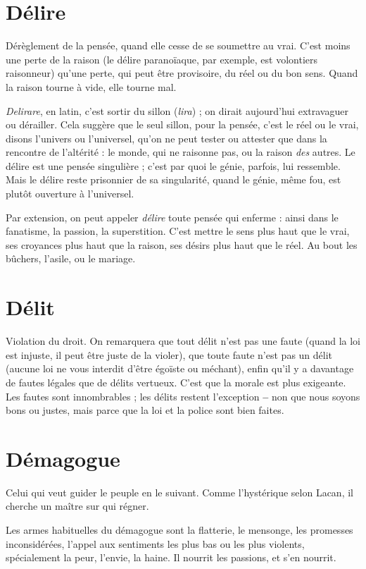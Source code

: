 \section{Délire}
Dérèglement de la pensée, quand elle cesse de se soumettre au vrai.
C’est moins une perte de la raison (le délire paranoïaque, par
exemple, est volontiers raisonneur) qu’une perte, qui peut être provisoire, du
réel ou du bon sens. Quand la raison tourne à vide, elle tourne mal.

{\it Delirare}, en latin, c’est sortir du sillon ({\it lira}) ; on dirait aujourd’hui extravaguer
ou dérailler. Cela suggère que le seul sillon, pour la pensée, c’est le réel ou
le vrai, disons l’univers ou l’universel, qu’on ne peut tester ou attester que dans
la rencontre de l’altérité : le monde, qui ne raisonne pas, ou la raison {\it des} autres.
Le délire est une pensée singulière ; c’est par quoi le génie, parfois, lui ressemble.
Mais le délire reste prisonnier de sa singularité, quand le génie, même
fou, est plutôt ouverture à l’universel.

Par extension, on peut appeler {\it délire} toute pensée qui enferme : ainsi dans
le fanatisme, la passion, la superstition. C’est mettre le sens plus haut que le
vrai, ses croyances plus haut que la raison, ses désirs plus haut que le réel. Au
bout les bûchers, l'asile, ou le mariage.

\section{Délit}
Violation du droit. On remarquera que tout délit n’est pas une faute
(quand la loi est injuste, il peut être juste de la violer), que toute
faute n’est pas un délit (aucune loi ne vous interdit d’être égoïste ou méchant),
enfin qu’il y a davantage de fautes légales que de délits vertueux. C’est que la
morale est plus exigeante. Les fautes sont innombrables ; les délits restent
l'exception {\bf --} non que nous soyons bons ou justes, mais parce que la loi et la
police sont bien faites.

\section{Démagogue}
Celui qui veut guider le peuple en le suivant. Comme l'hystérique
selon Lacan, il cherche un maître sur qui régner.

Les armes habituelles du démagogue sont la flatterie, le mensonge, les promesses
inconsidérées, l'appel aux sentiments les plus bas ou les plus violents,
spécialement la peur, l'envie, la haine. Il nourrit les passions, et s’en nourrit.

